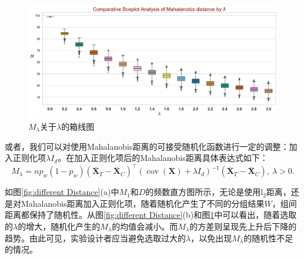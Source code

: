 \begin{figure}[!htbp]
    \centering
    \includegraphics[width=1\linewidth]{figures/boxplot_Mahalanobis_distance_by_lambda.png}
    \caption{$M_{\lambda}$关于$\lambda$的箱线图}
    \label{fig:M_lambda's boxplot}
\end{figure}

或者，我们可以对使用Mahalanobis距离的可接受随机化函数进行一定的调整：加入正则化项$\lambda I_d$。在加入正则化项后的Mahalanobis距离具体表达式如下：
\begin{equation}
    M_{\lambda}=n p_w\left(1-p_w\right)\left(\overline{\mathbf{X}}_T-\overline{\mathbf{X}}_C\right)^{\top} \left(\operatorname{cov}(\mathbf{X})+\lambda I_d\right)^{-1}\left(\overline{\mathbf{X}}_T-\overline{\mathbf{X}}_C\right),\ \lambda > 0.
\end{equation}

如图\ref{fig:different Distance}(a)中$M_1$和$D$的频数直方图所示，无论是使用$\mathrm{l}_2$距离，还是对Mahalanobis距离加入正则化项，随着随机化产生了不同的分组结果$W$，组间距离都保持了随机性。从图\ref{fig:different Distance}(b)和图\ref{fig:M_lambda's boxplot}中可以看出，随着选取的$\lambda$的增大，随机化产生的$M_{\lambda}$的均值会减小。而$M_{\lambda}$的方差则呈现先上升后下降的趋势。由此可见，实验设计者应当避免选取过大的$\lambda$，以免出现$M_{\lambda}$的随机性不足的情况。


